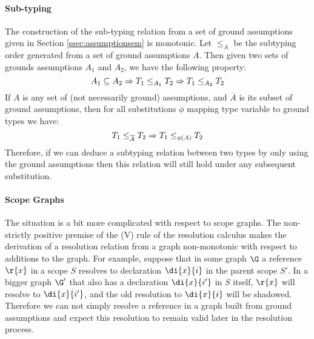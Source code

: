 \paragraph{Sub-typing}
The construction of the sub-typing relation from a set of ground assumptions
given in Section \ref{ssec:assumptionsem} is monotonic. Let $\leq_A$ be the subtyping order generated from a set of 
ground assumptions $A$. 
Then given two sets of grounds assumptions $A_1$ and $A_2$, we have the following property: \vspace*{-2mm}
$$A_1 \subseteq A_2 \Rightarrow T_1 \leq_{A_1} T_2 \Rightarrow  T_1 \leq_{A_2} T_2\vspace*{-2mm}$$
If $A$ is any set of (not necessarily ground) assumptions, and $\overline{A}$ is its subset of ground assumptions, 
then for all substitutions $\phi$ mapping type variable to ground types we have:\vspace*{-2mm}
$$ T_1 \leq_{\overline{A}} T_2 \Rightarrow  T_1 \leq_{\phi(A)} T_2\vspace*{-2mm}$$
Therefore, if we can deduce a subtyping relation between two types by only using the ground assumptions then this relation 
will still hold under any subsequent substitution. 

\paragraph{Scope Graphs}



The situation is a bit more complicated with respect to scope graphs.
The non-strictly positive premise of the (V) rule of the resolution calculus
makes the derivation of a resolution relation from a graph non-monotonic with
respect to additions to the graph.
For example, suppose that in some graph $\G$ a reference $\r{x}$ in a scope $S$ resolves to declaration $\di{x}{i}$ 
in the parent scope $S'$. In a bigger graph $\G'$ that also has a declaration $\di{x}{i'}$ in $S$ itself, 
$\r{x}$ will resolve to $\di{x}{i'}$, and the old resolution to $\di{x}{i}$ will be shadowed. 
Therefore we can not simply resolve a reference in a graph built from ground assumptions and expect this
resolution to remain valid later in the resolution process.

